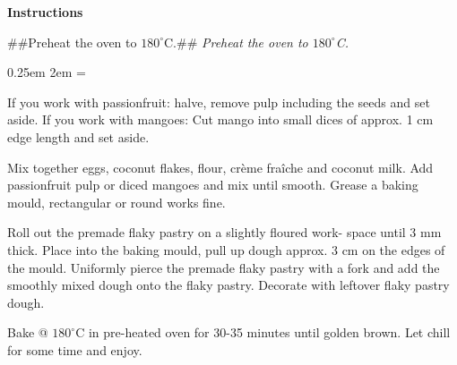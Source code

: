 \documentclass{article}
\newcommand{\temp}[1]{%
    $#1^\circ$C}
\newcounter{stepnum}
\newenvironment{method}[1][]{%
    \setcounter{stepnum}{0}
    \noindent
    {\color{red}\Large\textbf{Instructions}}%
    \par
    \smallskip
    \if###1##%
    \else
        \noindent
        \emph{#1}
        \par
    \fi
    \begingroup
    \parindent0pt
    \parskip0.25em
        \leftskip2em
    \everypar={\llap{\stepcounter{stepnum}\hbox to2em{\thestepnum.\hfill}}}
}{%
    \par
    \endgroup
    }
\begin{document}
\begin{method}[Preheat the oven to \temp{180}.]
     If you work with passionfruit: halve, remove pulp including the seeds and set aside.
     If you work with mangoes: Cut mango into small dices of approx. 1 cm edge length and set aside.

     Mix together eggs, coconut flakes, flour, crème fraîche and coconut milk. Add passionfruit pulp or diced mangoes and mix until smooth. Grease a baking mould, rectangular or round works fine.

     Roll out the premade flaky pastry on a slightly floured work- space until 3 mm thick. Place into the baking mould, pull up dough approx. 3 cm on the edges of the mould. Uniformly pierce the premade flaky pastry with a fork and add the smoothly mixed dough onto the flaky pastry. Decorate with leftover flaky pastry dough.

     Bake @ \temp{180} in pre-heated oven for 30-35 minutes until golden brown. Let chill for some time and enjoy.

\end {method}
\end{document}
